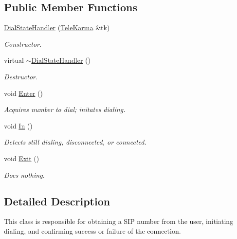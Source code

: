 \subsection*{Public Member Functions}
\begin{CompactItemize}
\item 
\hyperlink{classDialStateHandler_f0dfbbd00faaa0acd869655c510b6e72}{DialStateHandler} (\hyperlink{classTeleKarma}{TeleKarma} \&tk)
\begin{CompactList}\small\item\em Constructor. \item\end{CompactList}\item 
virtual \hyperlink{classDialStateHandler_e2ea834e79a07ec0083b08e51b5f0b25}{$\sim$DialStateHandler} ()
\begin{CompactList}\small\item\em Destructor. \item\end{CompactList}\item 
void \hyperlink{classDialStateHandler_945709f5589569cf5441b1c779efed7c}{Enter} ()
\begin{CompactList}\small\item\em Acquires number to dial; initates dialing. \item\end{CompactList}\item 
void \hyperlink{classDialStateHandler_94e5a408fd9758b535ec28780b53b7a8}{In} ()
\begin{CompactList}\small\item\em Detects still dialing, disconnected, or connected. \item\end{CompactList}\item 
void \hyperlink{classDialStateHandler_5ad70749559b320cb64db1e04db04622}{Exit} ()
\begin{CompactList}\small\item\em Does nothing. \item\end{CompactList}\end{CompactItemize}


\subsection{Detailed Description}
This class is responsible for obtaining a SIP number from the user, initiating dialing, and confirming success or failure of the connection. 

